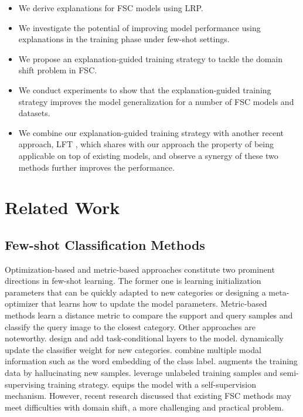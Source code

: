 \documentclass[a4paper,conference]{IEEEtran}
\begin{document}
\begin{itemize}
\item We derive explanations for FSC models using LRP.
\item We investigate the potential of improving model performance using explanations in the training phase under few-shot settings.
\item We propose an explanation-guided training strategy to tackle the domain shift problem in FSC. 
\item We conduct experiments to show that the explanation-guided training strategy improves the model generalization for a number of FSC models and datasets. 
\item We combine our explanation-guided training strategy with another recent approach, LFT \cite{FeaturewiseTranslayer:tseng2020cross}, which shares with our approach the property of being applicable on top of existing models, and observe a synergy of these two methods further improves the performance.
\end{itemize}




\section{Related Work}
\label{sec:related work}
\subsection{Few-shot Classification Methods}
Optimization-based and metric-based approaches constitute two prominent directions in few-shot learning. The former one is learning initialization parameters that can be quickly adapted to new categories \cite{MAML:finn2017model,Reptile:nichol2018reptile,LEO:rusu2018metalearning,MTL:sun2019meta} or designing a meta-optimizer that learns how to update the model parameters\cite{LSTMoptimizer:ravi2016optimization, MANN:santoro2016meta, SNAIL:mishra2018a, METANETWORK:munkhdalai2017meta}. Metric-based methods learn a distance metric to compare the support and query samples and classify the query image to the closest category\cite{MatchNet:vinyals2016matching, RN:sung2018learning, PROTO:snell2017prototypical, FEWGNN:garcia2018fewshot, TPN:liu2018learning, SUBSPACE:devos2019subspace, CAN:hou2019cross}. Other approaches are noteworthy. \cite{TADAM:oreshkin2018tadam, SIMPLECANPS:bateni2020improved} design and add task-conditional layers to the model. \cite{DYNAMIC:gidaris2018dynamic, ImprintedWeight:qi2018low, GCW:gidaris2019generating} dynamically update the classifier weight for new categories. \cite{MARGINLOSS:li2020boosting, CROSSMODAL:xing2019adaptive} combine multiple modal information such as the word embedding of the class label. \cite{Imaginary:wang2018low} augments the training data by hallucinating new samples. \cite{LST:li2019learning, SEMISUP:ren2018meta} leverage unlabeled training samples and semi-supervising training strategy. \cite{SELFSupervise:Gidaris_2019_ICCV} equips the model with a self-supervision mechanism. However, recent research discussed that existing FSC methods may meet difficulties with domain shift, a more challenging and practical problem\cite{ACLOSERLOOK:chen2018a}. 
\end{document}
